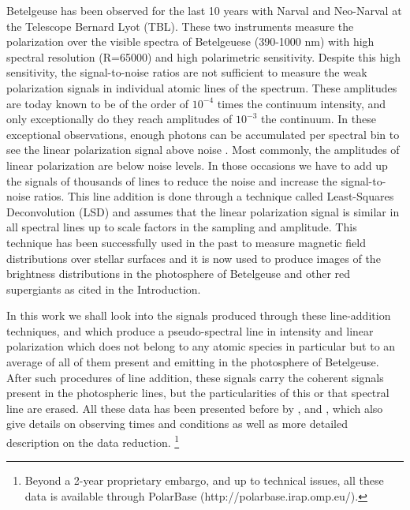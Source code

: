 \documentclass{aa}
\begin{document}
Betelgeuse has been observed for the last 10 years with Narval and Neo-Narval at the Telescope Bernard Lyot (TBL). These two instruments measure the polarization 
over the visible spectra of Betelgeuese (390-1000 nm) with high spectral resolution (R=65000) and high polarimetric sensitivity. Despite 
this high sensitivity, the signal-to-noise ratios are not sufficient to measure the weak polarization signals in individual atomic lines of the 
spectrum. These amplitudes are today known to be of the order of $10^{-4}$ times the continuum intensity, and only exceptionally do they 
reach amplitudes of $10^{-3}$ the continuum. In these exceptional observations, enough photons can be accumulated per spectral bin to 
see the linear polarization signal above noise \citep{auriere_discovery_2016}. Most commonly, the amplitudes of linear polarization are below noise levels. In those 
occasions we have to add up the signals of thousands of lines to reduce the noise and increase the signal-to-noise ratios. This line addition 
is done through a technique called Least-Squares Deconvolution (LSD) \citep{donati_spectropolarimetric_1997} and assumes that the 
linear polarization signal is similar 
in all spectral lines up to scale factors in the sampling and amplitude. This technique has been successfully used in the past to measure 
magnetic field distributions over stellar surfaces and it is now used to produce images of the brightness distributions in the photosphere 
of Betelgeuse and other red supergiants as cited in the Introduction. 

In this work we shall look into the signals produced through these line-addition techniques, and which produce a pseudo-spectral line in intensity 
and linear polarization which does not belong to any atomic species in particular but to an average of all of them present and emitting in the 
photosphere of Betelgeuse. After such procedures of line addition, these signals carry the coherent signals present in the photospheric lines, but the particularities of this or 
that spectral line are erased. All these data has been presented before by \cite{auriere_discovery_2016}, \cite{mathias_evolution_2018} and 
\cite{lopez_ariste_three-dimensional_2022}, which also give details on observing times and conditions as well as more detailed description 
on the data reduction. \footnote[1]{Beyond a 2-year proprietary embargo, and up to technical issues, all these data is available through 
PolarBase (http://polarbase.irap.omp.eu/).}
\end{document}
